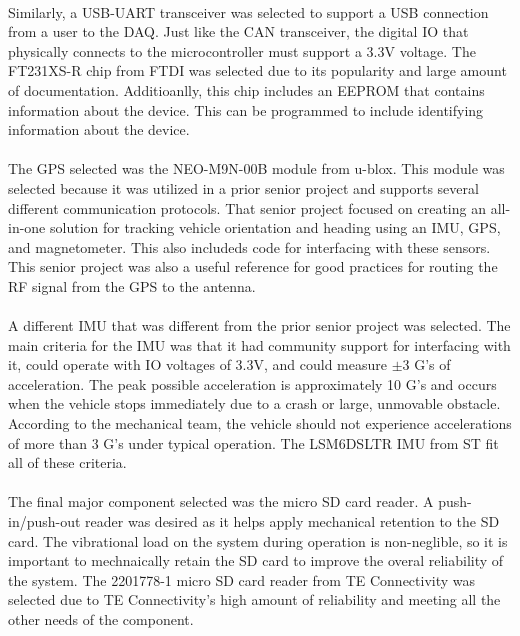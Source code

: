 \paragraph{}
Similarly, a USB-UART transceiver was selected to support a USB connection from a user to the DAQ.
Just like the CAN transceiver, the digital IO that physically connects to the microcontroller must support a 3.3V voltage.
The FT231XS-R chip from FTDI was selected due to its popularity and large amount of documentation.
Additioanlly, this chip includes an EEPROM that contains information about the device.
This can be programmed to include identifying information about the device.

\paragraph{}
The GPS selected was the NEO-M9N-00B module from u-blox.
This module was selected because it was utilized in a prior senior project and supports several different communication protocols.
That senior project focused on creating an all-in-one solution for tracking vehicle orientation and heading using an IMU, GPS, and magnetometer.
This also includeds code for interfacing with these sensors.
This senior project was also a useful reference for good practices for routing the RF signal from the GPS to the antenna.

\paragraph{}
A different IMU that was different from the prior senior project was selected.
The main criteria for the IMU was that it had community support for interfacing with it, could operate with IO voltages of 3.3V, and could measure $\pm$3 G's of acceleration.
The peak possible acceleration is approximately 10 G's and occurs when the vehicle stops immediately due to a crash or large, unmovable obstacle.
According to the mechanical team, the vehicle should not experience accelerations of more than 3 G's under typical operation.
The LSM6DSLTR IMU from ST fit all of these criteria.

\paragraph{}
The final major component selected was the micro SD card reader.
A push-in/push-out reader was desired as it helps apply mechanical retention to the SD card.
The vibrational load on the system during operation is non-neglible, so it is important to mechnaically retain the SD card to improve the overal reliability of the system.
The 2201778-1 micro SD card reader from TE Connectivity was selected due to TE Connectivity's high amount of reliability and meeting all the other needs of the component.

